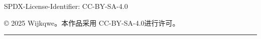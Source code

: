 \documentclass[12pt]{ctexbook}
\begin{document}



\tableofcontents

SPDX-License-Identifier: CC-BY-SA-4.0

© 2025 Wijkqwe。本作品采用 CC-BY-SA-4.0进行许可。

























\hrule








\end{document}
